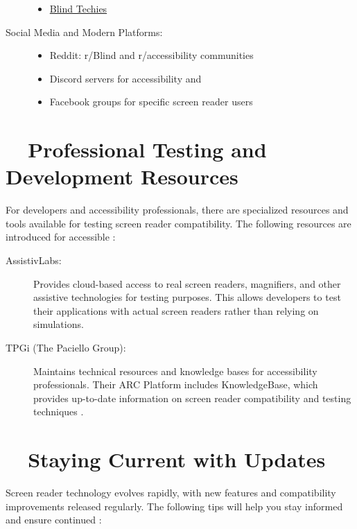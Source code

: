 \begin{description}
\begin{itemize}
		      \item \href{https://groups.io/g/blind-techies/}{Blind Techies}
	      \end{itemize}
	\item[Social Media and Modern Platforms:]
	      \begin{itemize}
		      \item Reddit: r/Blind and r/\gls{accessibility} communities
		      \item Discord servers for accessibility and 
		      \item Facebook groups for specific screen reader users
	      \end{itemize}
\end{description}

\section{~~Professional Testing and Development Resources}
\label{app1:testing}
For developers and accessibility professionals, there are specialized resources and tools available for testing screen reader compatibility. The following resources are introduced for accessible :

\begin{description}
	\item[AssistivLabs:] Provides cloud-based access to real screen readers, magnifiers, and other assistive technologies for testing purposes. This allows developers to test their applications with actual screen readers rather than relying on simulations.
	\item[TPGi (The Paciello Group):] Maintains technical resources and knowledge bases for accessibility professionals. Their ARC Platform includes KnowledgeBase, which provides up-to-date information on screen reader compatibility and testing techniques \cite{TPGiARC}.
\end{description}

\section{~~Staying Current with Updates}
\label{app1:updates}
Screen reader technology evolves rapidly, with new features and compatibility improvements released regularly. The following tips will help you stay informed and ensure continued :

